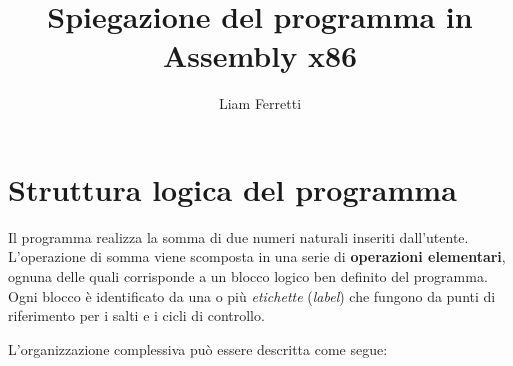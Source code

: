 \documentclass[a4paper,12pt]{article}
\title{Spiegazione del programma in Assembly x86}
\author{Liam Ferretti}
\date{}
\begin{document}
	
	\maketitle
	
	\section*{Struttura logica del programma}
	
	Il programma realizza la somma di due numeri naturali inseriti dall’utente.  
	L’operazione di somma viene scomposta in una serie di \textbf{operazioni elementari}, ognuna delle quali corrisponde a un blocco logico ben definito del programma.  
	Ogni blocco è identificato da una o più \textit{etichette} (\textit{label}) che fungono da punti di riferimento per i salti e i cicli di controllo.  
	
	L’organizzazione complessiva può essere descritta come segue:
	
\end{document}
